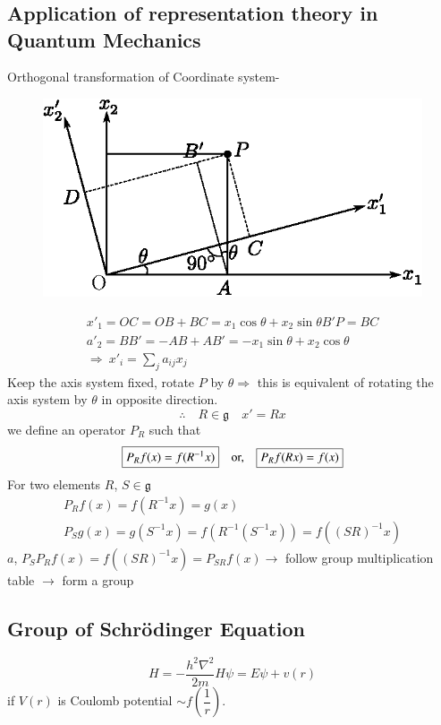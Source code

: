\chapter[Lecture 8]{}\label{lec8}

\section*{Application of representation theory in Quantum Mechanics}

Orthogonal transformation of Coordinate system-
\begin{figure}[H]
\centering
\includegraphics{images/lecture8/fig1.eps}
\end{figure}
\begin{gather*}
x'_{1}=OC=OB+BC=x_{1}\cos \theta+x_{2}\sin\theta B'P=BC\\
a'_{2}=BB'=-AB+AB'=-x_{1}\sin\theta + x_{2}\cos \theta\\
\Rightarrow \ x'_{i}=\sum\limits_{j}a_{ij}x_{j}
\end{gather*}
Keep the axis system fixed, rotate $P$ by $\theta\Rightarrow$ this is equivalent of rotating the axis system by $\theta$ in opposite direction.
$$
\therefore\quad R\in \mathfrak{g}\quad x'=Rx
$$
we define an operator $P_{R}$ such that
$$
\fbox{$P_{R}f(x)=f(R^{-1}x)$}\quad\text{or,}\quad \fbox{$P_{R}f(Rx)=f(x)$}
$$
For two elements $R$, $S\in \mathfrak{g}$
\begin{gather*}
P_{R}f(x)=f(R^{-1}x)=g(x)\\
P_{S}g(x)=g(S^{-1}x)=f(R^{-1}(S^{-1}x))=f((SR)^{-1}x)
\end{gather*}
$a$, $P_{S}P_{R}f(x)=f((SR)^{-1}x)=P_{SR}f(x)\to$ follow group multiplication table $\to$ form a group

\section*{Group of Schr\"odinger Equation}
$$
H=-\dfrac{h^{2}\nabla^{2}}{2m}H\psi=E\psi+v(r)
$$
if $V(r)$ is Coulomb potential $\sim f\left(\dfrac{1}{r}\right)$.

